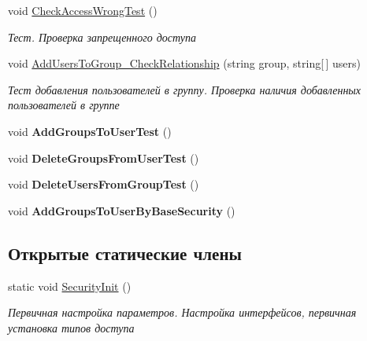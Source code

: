 \begin{DoxyCompactItemize}
void \hyperlink{class_security_1_1_entity_framework_1_1_tests_1_1_security_work_unit_test_ab1ed6b439cdccc8b1f52fd1d6b4870fa}{Check\+Access\+Wrong\+Test} ()
\begin{DoxyCompactList}\small\item\em Тест. Проверка запрещенного доступа \end{DoxyCompactList}\item 
void \hyperlink{class_security_1_1_entity_framework_1_1_tests_1_1_security_work_unit_test_a0a1658e7f72c000876c020c3678b3390}{Add\+Users\+To\+Group\+\_\+\+Check\+Relationship} (string group, string\mbox{[}$\,$\mbox{]} users)
\begin{DoxyCompactList}\small\item\em Тест добавления пользователей в группу. Проверка наличия добавленных пользователей в группе \end{DoxyCompactList}\item 
\mbox{\label{class_security_1_1_entity_framework_1_1_tests_1_1_security_work_unit_test_a7e7eb2f4835b1f9be9004cf0c33ac605}} 
void {\bfseries Add\+Groups\+To\+User\+Test} ()
\item 
\mbox{\label{class_security_1_1_entity_framework_1_1_tests_1_1_security_work_unit_test_a48e5a47a35e958fcdded44399dd51b89}} 
void {\bfseries Delete\+Groups\+From\+User\+Test} ()
\item 
\mbox{\label{class_security_1_1_entity_framework_1_1_tests_1_1_security_work_unit_test_a35609f88e28a9cfc2cdeb30994bcb537}} 
void {\bfseries Delete\+Users\+From\+Group\+Test} ()
\item 
\mbox{\label{class_security_1_1_entity_framework_1_1_tests_1_1_security_work_unit_test_a3aa807bf7c7dc30b1b252ed4427df427}} 
void {\bfseries Add\+Groups\+To\+User\+By\+Base\+Security} ()
\end{DoxyCompactItemize}
\subsection*{Открытые статические члены}
\begin{DoxyCompactItemize}
\item 
static void \hyperlink{class_security_1_1_entity_framework_1_1_tests_1_1_security_work_unit_test_acf6d718d3dbd7c4ece47dddef6f1e6f8}{Security\+Init} ()
\begin{DoxyCompactList}\small\item\em Первичная настройка параметров. Настройка интерфейсов, первичная установка типов доступа \end{DoxyCompactList}\end{DoxyCompactItemize}


